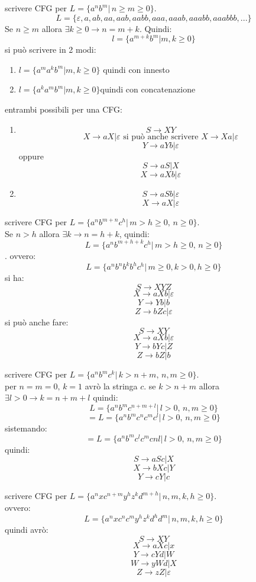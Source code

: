 \begin{example}
	scrivere CFG per $L=\{a^nb^m|\, n\geq m \geq 0\}
	$.$$L=\{\varepsilon, a, ab, aa, aab, aabb, aaa, aaab, aaabb, aaabbb,...\}$$
	Se $n\geq m$ allora $\exists k\geq 0 \to n=m+k$. Quindi:
	$$l=\{a^{m+k}b^m|m,k\geq0\}$$ si può scrivere in 2 modi:
	\begin{enumerate}
		\item $l=\{a^ma^kb^m|m,k\geq0\}$ quindi con innesto
		\item $l=\{a^ka^mb^m|m,k\geq0\}$quindi con concatenazione
	\end{enumerate}
	entrambi possibili per una CFG:
	\begin{enumerate}
		\item
		      $$S\to XY$$
		      $$X\to aX|\varepsilon \mbox{ si può anche scrivere } X\to Xa|\varepsilon$$
		      $$Y\to aYb|\varepsilon$$
		      oppure
		      $$S\to aS|X$$
		      $$X\to aXb| \varepsilon$$
		\item
		      $$S\to aSb|\varepsilon$$
		      $$X\to aX|\varepsilon$$
	\end{enumerate}
\end{example}
\begin{example}
	scrivere CFG per $L=\{a^nb^{m+n}c^h|\, m>h\geq0,\, n\geq0\}
	$.\\
	Se $n>h$ allora $\exists k \to n= h+k$, quindi:
	$$L=\{a^nb^{m+h+k}c^h|\, m>h\geq0,\, n\geq0\}$$. ovvero:
	$$L=\{a^nb^nb^kb^hc^h|\, m\geq 0, k>0, h\geq 0\}$$
	si ha:
	$$S\to XYZ$$
	$$X\to aXb|\varepsilon$$
	$$Y\to Yb|b$$
	$$Z\to bZc|\varepsilon$$
	si può anche fare:
	$$S\to XY$$
	$$X\to aXb|\varepsilon$$
	$$Y\to bYc|Z$$
	$$Z\to bZ|b$$
\end{example}
\begin{example}
	scrivere CFG per $L=\{a^nb^mc^k|\, k>n+m,\, n,m\geq 0\}
	$.\\
	per $n=m=0,\, k=1$ avrò la stringa $c$.
	se $k>n+m$ allora $\exists l>0\to k=n+m+l$ quindi:
	$$L=\{a^nb^mc^{n+m+l}|\, l>0,\, n,m\geq 0\}
	$$
	$$=L=\{a^nb^mc^nc^mc^l|\, l>0,\, n,m\geq 0\}$$
	sistemando:
	$$=L=\{a^nb^mc^lc^mcnl|\, l>0,\, n,m\geq 0\}$$
	quindi:
	$$S\to aSc|X$$
	$$X\to bXc|Y$$
	$$Y\to cY|c$$
\end{example}
\newpage
\begin{example}
	scrivere CFG per $L=\{a^nxc^{n+m}y^hz^kd^{m+h}|\, n,m,k,h\geq 0\}
	$.\\
	ovvero:
	$$L=\{a^nxc^nc^my^hz^kd^hd^m|\, n,m,k,h\geq 0\}$$
	quindi avrò:
	$$S\to XY$$
	$$X\to aXc|x$$
	$$Y\to cYd|W$$
	$$W\to yWd|X$$
	$$Z\to zZ|\varepsilon$$
\end{example}
